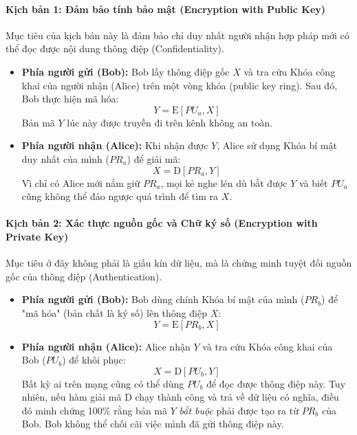 \paragraph*{Kịch bản 1: Đảm bảo tính bảo mật (Encryption with Public Key)}
Mục tiêu của kịch bản này là đảm bảo chỉ duy nhất người nhận hợp pháp mới có thể đọc được nội dung thông điệp (Confidentiality).
\begin{itemize}
    \item \textbf{Phía người gửi (Bob):} Bob lấy thông điệp gốc $X$ và tra cứu Khóa công khai của người nhận (Alice) trên một vòng khóa (public key ring). Sau đó, Bob thực hiện mã hóa:
    $$Y = \mathrm{E}[PU_a, X]$$
    Bản mã $Y$ lúc này được truyền đi trên kênh không an toàn.
    \item \textbf{Phía người nhận (Alice):} Khi nhận được $Y$, Alice sử dụng Khóa bí mật duy nhất của mình ($PR_a$) để giải mã:
    $$X = \mathrm{D}[PR_a, Y]$$
    Vì chỉ có Alice mới nắm giữ $PR_a$, mọi kẻ nghe lén dù bắt được $Y$ và biết $PU_a$ cũng không thể đảo ngược quá trình để tìm ra $X$.
\end{itemize}

\paragraph*{Kịch bản 2: Xác thực nguồn gốc và Chữ ký số (Encryption with Private Key)}
Mục tiêu ở đây không phải là giấu kín dữ liệu, mà là chứng minh tuyệt đối nguồn gốc của thông điệp (Authentication).
\begin{itemize}
    \item \textbf{Phía người gửi (Bob):} Bob dùng chính Khóa bí mật của mình ($PR_b$) để "mã hóa" (bản chất là ký số) lên thông điệp $X$:
    $$Y = \mathrm{E}[PR_b, X]$$
    \item \textbf{Phía người nhận (Alice):} Alice nhận $Y$ và tra cứu Khóa công khai của Bob ($PU_b$) để khôi phục:
    $$X = \mathrm{D}[PU_b, Y]$$
    Bất kỳ ai trên mạng cũng có thể dùng $PU_b$ để đọc được thông điệp này. Tuy nhiên, nếu hàm giải mã $\mathrm{D}$ chạy thành công và trả về dữ liệu có nghĩa, điều đó minh chứng 100\% rằng bản mã $Y$ \textit{bắt buộc} phải được tạo ra từ $PR_b$ của Bob. Bob không thể chối cãi việc mình đã gửi thông điệp này.
\end{itemize}

